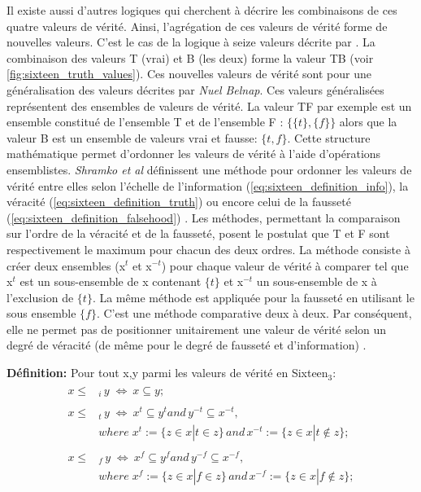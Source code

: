 \begin{refsegment}
    Il existe aussi d'autres logiques qui cherchent à décrire les combinaisons de ces quatre valeurs de vérité. Ainsi, l'agrégation de ces valeurs de vérité forme de nouvelles valeurs. C'est le cas de la logique à seize valeurs décrite par \citeauthor{shramko2005some} \cite{shramko2005some,shramko2011truth,shramko2006hyper}. La combinaison des valeurs T (vrai) et B (les deux) forme la valeur TB (voir \cref{fig:sixteen_truth_values}). Ces nouvelles valeurs de vérité sont pour \citeauthor{shramko2005some} une généralisation des valeurs décrites par \textit{Nuel Belnap}. Ces valeurs généralisées représentent des ensembles de valeurs de vérité. La valeur TF par exemple est un ensemble constitué de l'ensemble T et de l'ensemble F : $\{\{t\},\{f\}\}$ alors que la valeur B est un ensemble de valeurs vrai et fausse: $\{t,f\}$. Cette structure mathématique permet d'ordonner les valeurs de vérité à l'aide d'opérations ensemblistes. \textit{Shramko et al} définissent une méthode pour ordonner les valeurs de vérité entre elles selon l'échelle de l'information (\ref{eq:sixteen_definition_info}), la véracité (\ref{eq:sixteen_definition_truth}) ou encore celui de la fausseté (\ref{eq:sixteen_definition_falsehood}) . Les méthodes, permettant la comparaison sur l'ordre de la véracité et de la fausseté, posent le postulat que T et F sont respectivement le maximum pour chacun des deux ordres. La méthode consiste à créer deux ensembles (x$^{t}$ et x$^{-t}$) pour chaque valeur de vérité à comparer tel que x$^{t}$ est un sous-ensemble de x contenant $\{t\}$ et x$^{-t}$ un sous-ensemble de x à l'exclusion de $\{t\}$. La même méthode est appliquée pour la fausseté en utilisant le sous ensemble $\{f\}$.  C'est une méthode comparative deux à deux. Par conséquent, elle ne permet pas de positionner unitairement une valeur de vérité selon un degré de véracité (de même pour le degré de fausseté et d'information) .
    
    \textbf{Définition:} Pour tout x,y parmi les valeurs de vérité en Sixteen$_{3}$:\nolisttopbreak \vspace{-0.5cm}
    \begin{align}
        \begin{split}
        x \leq& _{i} \, y \; \iff \: x \subseteq y\label{eq:sixteen_definition_info};
        \end{split}\\ \begin{split}\label{eq:sixteen_definition_truth}
        x \leq& _{t} \, y \; \iff \: x^{t} \subseteq y^{t} and \, y^{-t} \subseteq x^{-t},\\
              &where \; x^{t} := \{z \in x | t \in z \} \, and \, x^{-t} := \{z \in x | t \notin z \};
        \end{split}\\ \begin{split}\label{eq:sixteen_definition_falsehood}
        x \leq& _{f} \, y \; \iff \: x^{f} \subseteq y^{f} and \, y^{-f} \subseteq x^{-f},\\
              &where \; x^{f} := \{z \in x | f \in z \} \, and \, x^{-f} := \{z \in x | f \notin z \};
        \end{split}
    \end{align}
    

\end{refsegment}
